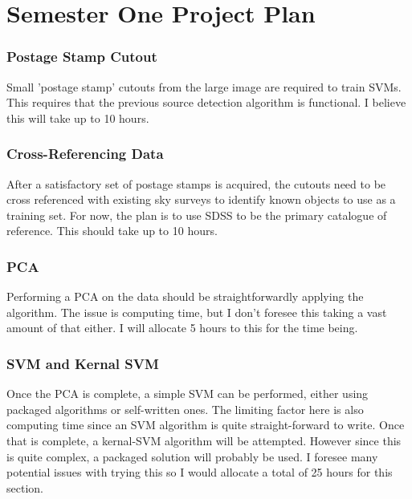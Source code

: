 \documentclass[a4paper,fleqn,usenatbib]{mnras}
\begin{document}
%












\appendix

\section{Semester One Project Plan}
\label{App:project plan}
\subsubsection{Postage Stamp Cutout}
Small 'postage stamp' cutouts from the large image are required to train SVMs. This requires that the previous source detection algorithm is functional. I believe this will take up to 10 hours. 
\subsubsection{Cross-Referencing Data}
After a satisfactory set of postage stamps is acquired, the cutouts need to be cross referenced with existing sky surveys to identify known objects to use as a training set. For now, the plan is to use SDSS to be the primary catalogue of reference. This should take up to 10 hours.
\subsubsection{PCA}
Performing a PCA on the data should be straightforwardly applying the algorithm. The issue is computing time, but I don't foresee this taking a vast amount of that either. I will allocate 5 hours to this for the time being.
\subsubsection{SVM and Kernal SVM}
Once the PCA is complete, a simple SVM can be performed, either using packaged algorithms or self-written ones. The limiting factor here is also computing time since an SVM algorithm is quite straight-forward to write.
Once that is complete, a kernal-SVM algorithm will be attempted. However since this is quite complex, a packaged solution will probably be used. I foresee many potential issues with trying this so I would allocate a total of 25 hours for this section.
\end{document}
